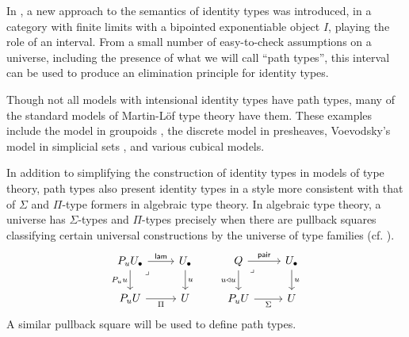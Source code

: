 In \cite{awodey2026},
a new approach to the semantics of identity types was introduced,
in a category with finite limits with a bipointed exponentiable object $I$,
playing the role of an interval. 
From a small number of easy-to-check assumptions on a universe,
including the presence of what we will call ``path types'',
this interval can be used to produce an elimination principle for identity types.

Though not all models with intensional identity types have path types,
many of the standard models of Martin-L\"of type theory have them.
These examples include the model in groupoids \cite{hofmann1995},
the discrete model in presheaves,
Voevodsky's model in simplicial sets \cite{kapulkin2021},
and various cubical models.

In addition to simplifying the construction of identity types in models of
type theory,
path types also present identity types in a style more consistent
with that of $\Sigma$ and $\Pi$-type formers in algebraic type theory.
In algebraic type theory, a universe has $\Sigma$-types and $\Pi$-types
precisely when there are pullback squares classifying certain
universal constructions by the universe of type families
(cf. ).
\[ \begin{tikzcd}
      {P_{\uu}{\Ulow}} & \Ulow \\
      {P_{\uu}{\U}} & \U
      \arrow["\lam", from=1-1, to=1-2]
      \arrow["{{P_{\uu}{\uu}}}"', from=1-1, to=2-1]
      \arrow["\lrcorner"{anchor=center, pos=0.125}, draw=none, from=1-1, to=2-2]
      \arrow["\uu", from=1-2, to=2-2]
      \arrow["\Pi"', from=2-1, to=2-2]
    \end{tikzcd} 
    \quad \quad 
    \begin{tikzcd}
      Q & \Ulow \\
      {P_\uu\U} & \U
      \arrow["\pair", from=1-1, to=1-2]
      \arrow["{\uu \pcomp \uu}"', from=1-1, to=2-1]
      \arrow["\lrcorner"{anchor=center, pos=0.125}, draw=none, from=1-1, to=2-2]
      \arrow["\uu", from=1-2, to=2-2]
      \arrow["\Sigma"', from=2-1, to=2-2]
    \end{tikzcd}\]
A similar pullback square will be used to define path types.

